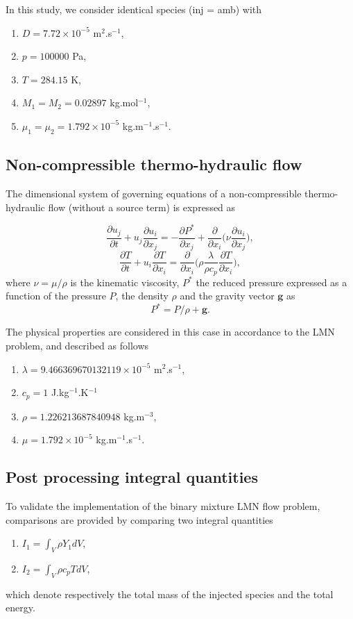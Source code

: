 In this study, we consider identical species (inj = amb) with
\begin{enumerate}
  \item $D = 7.72\times 10^{-5}$ m$^{2}$.s$^{-1}$,
  \item $p = 100000$ Pa,
  \item $T= 284.15$ K,
  \item $M_1=M_2=0.02897$ kg.mol$^{-1}$,
  \item $\mu_1=\mu_2=1.792\times 10^{-5}$ kg.m$^{-1}$.s$^{-1}$.
\end{enumerate}

\subsection{Non-compressible thermo-hydraulic flow}

The dimensional system of governing equations of a non-compressible thermo-hydraulic flow (without a source term) is expressed as

\begin{equation}\label{ns1}
\frac{\partial { u}_j }{\partial t}+ {u}_j\frac{\partial {u}_i }{\partial x_j}=-\frac{\partial{ P^{\ast}}}{\partial x_j} + \frac{\partial}{\partial x_i} \bigg( \nu \frac{\partial  u_i}{\partial x_j}\bigg),
\end{equation}
\begin{equation}\label{ns2}
\frac{\partial T}{\partial t}+  {u}_i\frac{\partial T}{\partial x_i}=\frac{\partial }{\partial x_i}\bigg( {\rho} \frac{\lambda}{\rho c_p} \frac{\partial T}{\partial x_i}\bigg),
\end{equation}
where $\nu=\mu/\rho$ is the kinematic viscosity, $P^{\ast}$ the reduced pressure expressed as a function of the pressure $P$,
the density $\rho$ and the gravity vector $\textbf{g}$ as
$$P^{\ast}=P/\rho + \textbf{g}.$$

The physical properties are considered in this case in accordance to the LMN problem, and described as follows
\begin{enumerate}
  \item $\lambda = 9.466369670132119\times 10^{-5}$ m$^{2}$.s$^{-1}$,
  \item $c_p=1$ J.kg$^{-1}$.K$^{-1}$
  \item $\rho=1.226213687840948$ kg.m$^{-3}$,
  \item $\mu=1.792\times 10^{-5}$ kg.m$^{-1}$.s$^{-1}$.
\end{enumerate}

\subsection{Post processing integral quantities}

To validate the implementation of the binary mixture LMN flow problem, comparisons are provided by comparing two integral quantities
\begin{enumerate}
  \item $I_1 =\displaystyle\int_V \rho Y_1 dV$,
  \item $I_2 =\displaystyle\int_V \rho c_p T dV$,
\end{enumerate}
which denote respectively the total mass of the injected species and the total energy.
